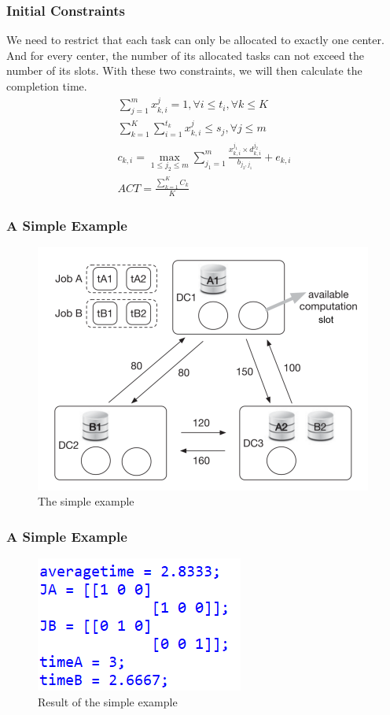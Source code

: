 \begin{frame}
\frametitle{Initial Constraints}
    We need to restrict that each task can only be allocated to exactly one center. And for every center, the number of its allocated tasks can not exceed the number of its slots. With these two constraints, we will then calculate the completion time.
\begin{align}
    \sum_{j=1}^m x_{k,i}^j=1,\forall i\leq t_i,\forall k\leq K \label{eq:one}\\
    \sum_{k=1}^K\sum_{i=1}^{t_k} x_{k,i}^j\leq s_j,\forall j\leq m \label{eq:slot}\\
    c_{k,i}=\max\limits_{1\leq j_2\leq m}\sum_{j_1=1}^m\frac{x_{k,i}^{j_1}\times d_{k,i}^{j_2}}{b_{j_2,j_1}}+e_{k,i} \label{eq:i3}\\
    ACT=\frac{\sum_{k=1}^K C_k}K \label{eq:iend}
\end{align}

\end{frame}

\begin{frame}
\frametitle{A Simple Example}
\begin{figure}[h]
    \centering
    \includegraphics[height=0.6\textheight]{img/simpleexample.png}
    \caption{The simple example}
    \label{fig:simple}
\end{figure}
\end{frame}

\begin{frame}
\frametitle{A Simple Example}
\begin{figure}[h]
    \centering
    \includegraphics[height=0.4\textheight]{img/exampleresult.png}
    \caption{Result of the simple example}
    \label{fig:result}
\end{figure}
    \end{frame}

